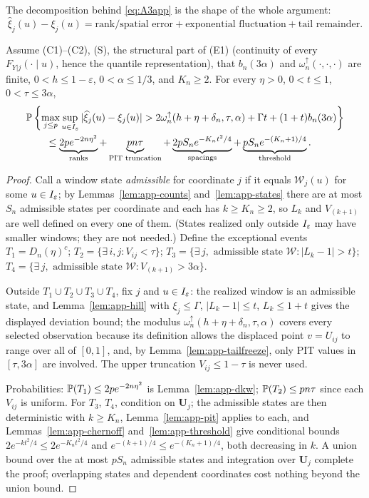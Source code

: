 The decomposition behind \eqref{eq:A3app} is the shape of the whole
argument:
\[
 \widehat\xi_j(u)-\xi_j(u)
 =\text{rank/spatial error}
 +\text{exponential fluctuation}
 +\text{tail remainder}.
\]

\begin{proposition}
\label{thm:app-rank-profile}
Assume (C1)--(C2), (S), the structural part of (E1) (continuity of
every $F_{Y|j}(\cdot\mid u)$, hence the quantile representation), that
$b_n(3\alpha)$ and $\omega_n^{\uparrow}(\cdot,\cdot,\cdot)$ are finite,
$0<h\le1-\varepsilon$, $0<\alpha\le1/3$, and $K_n\ge2$.  For every
$\eta>0$, $0<t\le1$, $0<\tau\le3\alpha$,
\begin{align}
&\mathbb P\left\{\max_{j\le p}\sup_{u\in I_\varepsilon}
 |\widehat\xi_j(u)-\xi_j(u)|
 >2\omega_n^{\uparrow}(h+\eta+\delta_n,\tau,\alpha)
 +\Gamma t+(1+t)b_n(3\alpha)\right\}
 \nonumber\\
&\qquad\le
 \underbrace{2pe^{-2n\eta^2}}_{\text{ranks}}
 +\underbrace{pn\tau}_{\text{PIT truncation}}
 +\underbrace{2pS_ne^{-K_nt^2/4}}_{\text{spacings}}
 +\underbrace{pS_ne^{-(K_n+1)/4}}_{\text{threshold}}.
 \label{eq:A4app}
\end{align}
\end{proposition}

\begin{proof}
Call a window state \emph{admissible} for coordinate $j$ if it equals
$\mathcal W_j(u)$ for some $u\in I_\varepsilon$; by
Lemmas~\ref{lem:app-counts} and~\ref{lem:app-states} there are at most
$S_n$ admissible states per coordinate and each has
$k\ge K_n\ge2$, so $L_k$ and $V_{(k+1)}$ are well defined on every one of
them.  (States realized only outside $I_\varepsilon$ may have smaller windows; they
are not needed.)  Define the exceptional events
$T_1=D_n(\eta)^c$;
$T_2=\{\exists\,i,j:V_{ij}<\tau\}$;
$T_3=\{\exists\,j,\text{ admissible state }\mathcal W:|L_k-1|>t\}$;
$T_4=\{\exists\,j,\text{ admissible state }\mathcal W:
V_{(k+1)}>3\alpha\}$.

Outside $T_1\cup T_2\cup T_3\cup T_4$, fix $j$ and $u\in I_\varepsilon$: the realized
window is an admissible state, and
Lemma~\ref{lem:app-hill} with $\xi_j\le\Gamma$, $|L_k-1|\le t$,
$L_k\le1+t$ gives the displayed deviation bound; the modulus
$\omega_n^{\uparrow}(h+\eta+\delta_n,\tau,\alpha)$ covers every selected
observation because its definition allows the displaced point
$v=U_{ij}$ to range over all of $[0,1]$, and, by
Lemma~\ref{lem:app-tailfreeze}, only PIT values in $[\tau,3\alpha]$ are
involved.  The upper truncation $V_{ij}\le1-\tau$ is never used.

Probabilities: $\mathbb P(T_1)\le2pe^{-2n\eta^2}$ is
Lemma~\ref{lem:app-dkw}; $\mathbb P(T_2)\le pn\tau$ since each $V_{ij}$ is
uniform.  For $T_3$, $T_4$, condition on $\bm U_j$; the admissible states
are then deterministic with $k\ge K_n$,
Lemma~\ref{lem:app-pit} applies to each, and
Lemmas~\ref{lem:app-chernoff} and~\ref{lem:app-threshold} give conditional
bounds $2e^{-kt^2/4}\le2e^{-K_nt^2/4}$ and
$e^{-(k+1)/4}\le e^{-(K_n+1)/4}$, both decreasing in $k$.  A union bound
over the at most $pS_n$ admissible states and
integration over $\bm U_j$ complete the proof; overlapping states and
dependent coordinates cost nothing beyond the union bound.
\end{proof}

